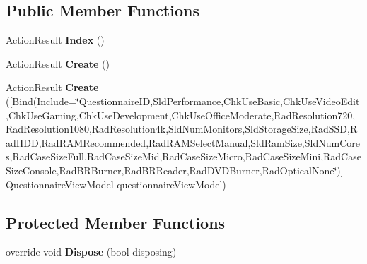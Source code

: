 \subsection*{Public Member Functions}
\begin{DoxyCompactItemize}
\item 
Action\+Result {\bfseries Index} ()\hypertarget{class_p_c_builder_m_v_c_1_1_controllers_1_1_questionnaire_controller_ac7fd83d5be85d3faa104f769f459741e}{}\label{class_p_c_builder_m_v_c_1_1_controllers_1_1_questionnaire_controller_ac7fd83d5be85d3faa104f769f459741e}

\item 
Action\+Result {\bfseries Create} ()\hypertarget{class_p_c_builder_m_v_c_1_1_controllers_1_1_questionnaire_controller_aee74d3623a8572991d23e6718ea5cc23}{}\label{class_p_c_builder_m_v_c_1_1_controllers_1_1_questionnaire_controller_aee74d3623a8572991d23e6718ea5cc23}

\item 
Action\+Result {\bfseries Create} (\mbox{[}Bind(Include=\char`\"{}Questionnaire\+ID,Sld\+Performance,Chk\+Use\+Basic,Chk\+Use\+Video\+Edit,Chk\+Use\+Gaming,Chk\+Use\+Development,Chk\+Use\+Office\+Moderate,Rad\+Resolution720,Rad\+Resolution1080,Rad\+Resolution4k,Sld\+Num\+Monitors,Sld\+Storage\+Size,Rad\+S\+SD,Rad\+H\+DD,Rad\+R\+A\+M\+Recommended,Rad\+R\+A\+M\+Select\+Manual,Sld\+Ram\+Size,Sld\+Num\+Cores,Rad\+Case\+Size\+Full,Rad\+Case\+Size\+Mid,Rad\+Case\+Size\+Micro,Rad\+Case\+Size\+Mini,Rad\+Case\+Size\+Console,Rad\+B\+R\+Burner,Rad\+B\+R\+Reader,Rad\+D\+V\+D\+Burner,Rad\+Optical\+None\char`\"{})\mbox{]} Questionnaire\+View\+Model questionnaire\+View\+Model)\hypertarget{class_p_c_builder_m_v_c_1_1_controllers_1_1_questionnaire_controller_a56e22d7a06a6dd75dca2244a994454da}{}\label{class_p_c_builder_m_v_c_1_1_controllers_1_1_questionnaire_controller_a56e22d7a06a6dd75dca2244a994454da}

\end{DoxyCompactItemize}
\subsection*{Protected Member Functions}
\begin{DoxyCompactItemize}
\item 
override void {\bfseries Dispose} (bool disposing)\hypertarget{class_p_c_builder_m_v_c_1_1_controllers_1_1_questionnaire_controller_a8b20695629cea08ed178104f70efe939}{}\label{class_p_c_builder_m_v_c_1_1_controllers_1_1_questionnaire_controller_a8b20695629cea08ed178104f70efe939}

\end{DoxyCompactItemize}
